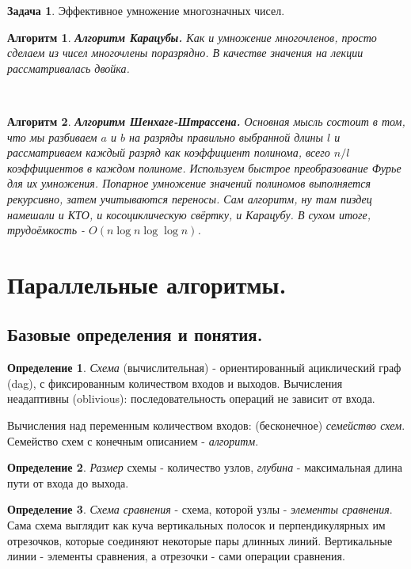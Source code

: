 \documentclass[a4paper]{article}
\theoremstyle{indented}
\newtheorem{alg}{Алгоритм}
\theoremstyle{definition}
\newtheorem{defn}{Определение}
\newtheorem{prob}{Задача}
\theoremstyle{remark}
\begin{document}
\begin{prob}
    Эффективное умножение многозначных чисел.
\end{prob}

\begin{alg}
    \textbf{Алгоритм Карацубы.} Как и умножение многочленов, просто сделаем из чисел многочлены поразрядно. В качестве значения на лекции рассматривалась двойка.
\end{alg} \

\begin{alg}
    \textbf{Алгоритм Шенхаге-Штрассена.} Основная мысль состоит в том, что мы разбиваем $a$ и $b$ на разряды правильно выбранной длины $l$ и рассматриваем каждый разряд как коэффициент полинома, всего $n/l$ коэффициентов в каждом полиноме. Используем быстрое преобразование Фурье для их умножения. Попарное умножение значений полиномов выполняется рекурсивно, затем учитываются переносы. Сам алгоритм, ну там пиздец намешали и КТО, и косоциклическую свёртку, и Карацубу. В сухом итоге, трудоёмкость - $O(n\log n \log \log n)$.
\end{alg}

\section{Параллельные алгоритмы.}

\subsection{Базовые определения и понятия.}

\begin{defn}
    \textit{Схема} (вычислительная) - ориентированный ациклический граф (dag), с фиксированным количеством входов и выходов. Вычисления неадаптивны (oblivious): последовательность операций не зависит от входа. \ 

    Вычисления над переменным количеством входов: (бесконечное) \textit{семейство схем}. Семейство схем с конечным описанием - \textit{алгоритм}.
\end{defn}

\begin{defn}
    \textit{Размер} схемы - количество узлов, \textit{глубина} - максимальная длина пути от входа до выхода.
\end{defn}

\begin{defn}
    \textit{Схема сравнения} - схема, которой узлы - \textit{элементы сравнения}. Сама схема выглядит как куча вертикальных полосок и перпендикулярных им отрезочков, которые соединяют некоторые пары длинных линий. Вертикальные линии - элементы сравнения, а отрезочки - сами операции сравнения.
\end{defn}
\end{document}
